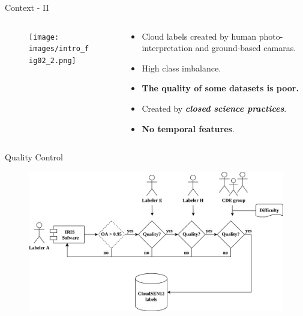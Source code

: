 \begin{frame}{Context - II}
	\begin{columns}
		\begin{column}{0.5\textwidth}
			\begin{figure}
				\texttt{[image: images/intro\_fig02\_2.png]}
				\label{fig:introfig02}
			\end{figure}	
		\end{column}
		\begin{column}{0.5\textwidth}
			\begin{itemize}
				\item Cloud labels created by human photo-interpretation and ground-based camaras.
				\item High class imbalance.	
				\item \textbf{The quality of some datasets is poor.}
				\item Created by \textbf{\textit{closed science practices}}.
				\item \textbf{No temporal features}.
			\end{itemize}
		\end{column}
	\end{columns}
\end{frame}





\begin{frame}{Quality Control}
	\begin{center}
		\begin{figure}
			\includegraphics[width=0.9\linewidth]{images/figure08.png}
		\end{figure}
	\end{center}
\end{frame}



